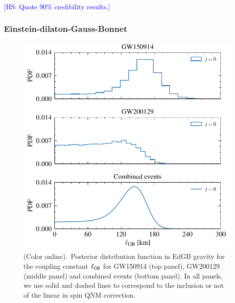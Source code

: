 \documentclass[twocolumn,
               prd,
               aps,
               superscriptaddress,
               tightenlines,
               nofootinbib,
               eqsecnum,
               amsfonts,
               amsmath,
               longbibliography]{revtex4-1}
\newcommand{\hs}[1]{{\textcolor{blue}{{[HS: #1]}} }}
\begin{document}
\hs{Quote 90\% credibility results.}




\subsubsection{Einstein-dilaton-Gauss-Bonnet}
\label{sec:results_edgb}

\begin{figure}[t]
\includegraphics[width=\columnwidth]{figs/edgb_posteriors_combined.pdf}
\caption{(Color online).~Posterior distribution function in EdGB gravity
for the coupling constant $\ell_{\rm GB}$ for GW150914 (top panel), GW200129 (middle panel)
and combined events (bottom panel).
%
In all panels, we use solid and dashed lines to correspond to the inclusion or not of the linear
in spin QNM correction.}
\label{fig:sGB_exec_sum}
\end{figure}
\end{document}
